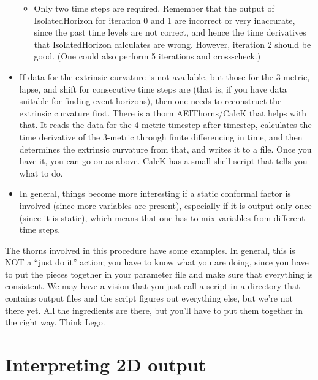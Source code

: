 \begin{itemize}
\begin{itemize}
\item Only two time steps are required. Remember that the output of
  IsolatedHorizon for iteration 0 and 1 are incorrect or very
  inaccurate, since the past time levels are not correct, and hence
  the time derivatives that IsolatedHorizon calculates are wrong.
  However, iteration 2 should be good.  (One could also perform 5
  iterations and cross-check.)

\end{itemize}


\item

  If data for the extrinsic curvature is not available, but those for
  the 3-metric, lapse, and shift for consecutive time steps are (that
  is, if you have data suitable for finding event horizons), then one
  needs to reconstruct the extrinsic curvature first.  There is a
  thorn AEIThorns/CalcK that helps with that.  It reads the data for
  the 4-metric timestep after timestep, calculates the time derivative
  of the 3-metric through finite differencing in time, and then
  determines the extrinsic curvature from that, and writes it to a
  file.  Once you have it, you can go on as above.  CalcK has a small
  shell script that tells you what to do.


\item

  In general, things become more interesting if a static conformal
  factor is involved (since more variables are present), especially if
  it is output only once (since it is static), which means that one
  has to mix variables from different time steps.

\end{itemize}

The thorns involved in this procedure have some examples.  In general,
this is NOT a ``just do it'' action; you have to know what you are
doing, since you have to put the pieces together in your parameter
file and make sure that everything is consistent.  We may have a
vision that you just call a script in a directory that contains output
files and the script figures out everything else, but we're not there
yet.  All the ingredients are there, but you'll have to put them
together in the right way.  Think Lego.



\section{Interpreting 2D output}

